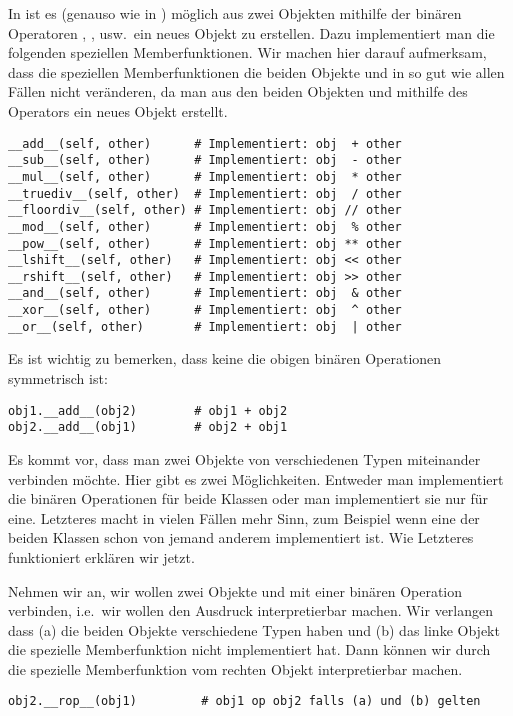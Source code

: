 In \Python ist es (genauso wie in \CPP) möglich aus zwei Objekten mithilfe der binären Operatoren
\lpy{+}, \lpy{-}, \lpy{*} usw.\ ein neues Objekt zu erstellen.
Dazu implementiert man die folgenden speziellen Memberfunktionen.
Wir machen hier darauf aufmerksam, dass die speziellen Memberfunktionen die beiden Objekte  und 
in so gut wie allen Fällen nicht veränderen, da man aus den beiden Objekten  und 
mithilfe des Operators  ein neues Objekt  erstellt.
\begin{lstlisting}
__add__(self, other)      # Implementiert: obj  + other
__sub__(self, other)      # Implementiert: obj  - other
__mul__(self, other)      # Implementiert: obj  * other
__truediv__(self, other)  # Implementiert: obj  / other
__floordiv__(self, other) # Implementiert: obj // other
__mod__(self, other)      # Implementiert: obj  % other
__pow__(self, other)      # Implementiert: obj ** other
__lshift__(self, other)   # Implementiert: obj << other
__rshift__(self, other)   # Implementiert: obj >> other
__and__(self, other)      # Implementiert: obj  & other
__xor__(self, other)      # Implementiert: obj  ^ other
__or__(self, other)       # Implementiert: obj  | other
\end{lstlisting}

Es ist wichtig zu bemerken, dass keine die obigen binären Operationen symmetrisch ist:
\begin{lstlisting}
obj1.__add__(obj2)        # obj1 + obj2
obj2.__add__(obj1)        # obj2 + obj1
\end{lstlisting}
Es kommt vor, dass man zwei Objekte von verschiedenen Typen miteinander verbinden möchte.
Hier gibt es zwei Möglichkeiten.
Entweder man implementiert die binären Operationen für beide Klassen oder man implementiert sie nur für eine.
Letzteres macht in vielen Fällen mehr Sinn, zum Beispiel wenn eine der beiden Klassen schon von jemand anderem implementiert ist.
Wie Letzteres funktioniert erklären wir jetzt.

Nehmen wir an, wir wollen zwei Objekte  und  mit einer binären Operation  verbinden,
i.e.\ wir wollen den Ausdruck  interpretierbar machen.
Wir verlangen dass
(a) die beiden Objekte verschiedene Typen haben und
(b) das linke Objekt  die spezielle Memberfunktion  nicht implementiert hat.
Dann können wir  durch die spezielle Memberfunktion  vom rechten Objekt  interpretierbar machen.
\begin{lstlisting}
obj2.__rop__(obj1)         # obj1 op obj2 falls (a) und (b) gelten
\end{lstlisting}

